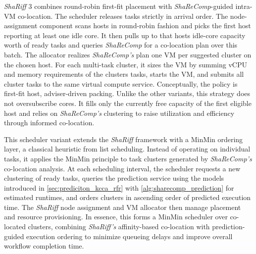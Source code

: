 \textit{ShaRiff} 3 combines round-robin first-fit placement with \textit{ShaReComp}-guided intra-VM co-location. The scheduler releases tasks strictly in arrival order. The node-assignment component scans hosts in round-robin fashion and picks the first host reporting at least one idle core. It then pulls up to that hosts idle-core capacity worth of ready tasks and queries \textit{ShaReComp} for a co-location plan over this batch.
The allocator realizes \textit{ShaReComp's} plan one VM per suggested cluster on the chosen host. For each multi-task cluster, it sizes the VM by summing vCPU and memory requirements of the clusters tasks, starts the VM, and submits all cluster tasks to the same virtual compute service.
Conceptually, the policy is first-fit host, adviser-driven packing. Unlike the other variants, this strategy does not oversubscribe cores. It fills only the currently free capacity of the first eligible host and relies on \textit{ShaReComp's} clustering to raise utilization and efficiency through informed co-location.


This scheduler variant extends the \textit{ShaRiff} framework with a MinMin ordering layer, a classical heuristic from list scheduling. Instead of operating on individual tasks, it applies the MinMin principle to task clusters generated by \textit{ShaReComp's} co-location analysis. At each scheduling interval, the scheduler requests a new clustering of ready tasks, queries the prediction service using the models introduced in \ref{sec:prediciton_kcca_rfr} with \ref{alg:sharecomp_prediction} for estimated runtimes, and orders clusters in ascending order of predicted execution time. The \textit{ShaRiff} node assignment and VM allocator then manage placement and resource provisioning. In essence, this forms a MinMin scheduler over co-located clusters, combining \textit{ShaRiff's} affinity-based co-location with prediction-guided execution ordering to minimize queueing delays and improve overall workflow completion time.

